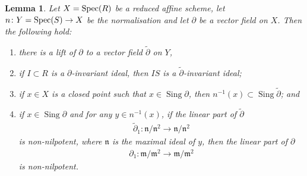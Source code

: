 \documentclass[12pt, a4paper]{amsart}
\DeclareMathOperator{\sing}{Sing}
\newtheorem{lemma}[theorem]{Lemma}
\theoremstyle{definition}
\theoremstyle{named}
\begin{document}
\begin{lemma}
    \label{lem_nonnilp_normal}
    Let $X = {\rm Spec}(R)$ be a reduced affine scheme, let $n\colon Y = {\rm Spec}(S) \rightarrow X$
    be the normalisation and let
    $\partial$
    be a vector field on $X$.
    Then the following hold:
    
    \begin{enumerate}
\item[(0)] there is a lift of $\partial$
to a vector field $\tilde{\partial}$
on $Y$,
    
\item[(1)] if $I \subset R$ is a $\partial$-invariant ideal, then 
$IS$ is a $\tilde{\partial}$-invariant ideal;
    
    \item[(2)] if $x \in X$ is a closed point such that $x \in \sing \partial$,
    then $n^{-1}(x) \subset \sing \tilde{\partial}$; and 

    \item[(3)] if $x \in \sing \partial$ and for any $y \in n^{-1}(x)$, if the linear part of $\tilde{\partial}$
    \begin{align*}\tilde{\partial}_1\colon \mathfrak n/\mathfrak n^2 \to \mathfrak n/\mathfrak n^2\end{align*}
    is non-nilpotent, where $\mathfrak n$ is the maximal ideal of $y$, 
    then the linear part of $\partial$
    \begin{align*}\partial_1\colon \mathfrak m/\mathfrak m^2 \to \mathfrak m/\mathfrak m^2\end{align*}
    is non-nilpotent.

    \end{enumerate}
\end{lemma}
\end{document}
